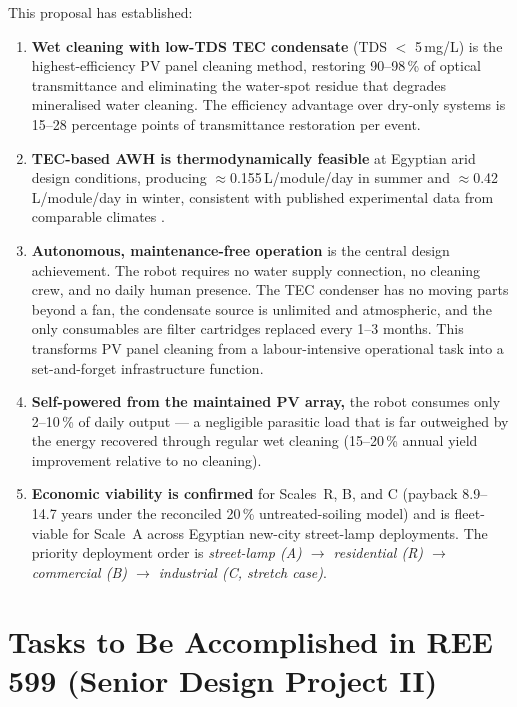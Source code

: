 \documentclass[12pt,a4paper]{report}
\numberwithin{equation}{chapter}
\numberwithin{figure}{chapter}
\numberwithin{table}{chapter}
\begin{document}
This proposal has established:

\begin{enumerate}[leftmargin=*, label=(\roman*)]
  \item \textbf{Wet cleaning with low-TDS TEC condensate} (TDS $<$ 5\,mg/L) is the
        highest-efficiency PV panel cleaning method, restoring 90--98\,\% of optical
        transmittance and eliminating the water-spot residue that degrades mineralised
        water cleaning. The efficiency advantage over dry-only systems is 15--28
        percentage points of transmittance restoration per event.
  \item \textbf{TEC-based AWH is thermodynamically feasible} at Egyptian arid design
        conditions, producing $\approx$0.155\,L/module/day in summer and
        $\approx$0.42\,L/module/day in winter, consistent with published experimental
        data from comparable climates \cite{alqaed2023awg,eslami2021tec,shourideh2021tec}.
  \item \textbf{Autonomous, maintenance-free operation} is the central design
        achievement. The robot requires no water supply connection, no cleaning crew,
        and no daily human presence. The TEC condenser has no moving parts beyond a
        fan, the condensate source is unlimited and atmospheric, and the only consumables
        are filter cartridges replaced every 1--3 months. This transforms PV panel
        cleaning from a labour-intensive operational task into a set-and-forget
        infrastructure function.
  \item \textbf{Self-powered from the maintained PV array,} the robot consumes only
        2--10\,\% of daily output --- a negligible parasitic load that is far outweighed
        by the energy recovered through regular wet cleaning (15--20\,\% annual yield
        improvement relative to no cleaning).
  \item \textbf{Economic viability is confirmed} for Scales~R, B, and C (payback
        8.9--14.7 years under the reconciled 20\,\% untreated-soiling model) and is
        fleet-viable for Scale~A across Egyptian new-city street-lamp deployments.
        The priority deployment order is \emph{street-lamp (A) $\to$ residential (R)
        $\to$ commercial (B) $\to$ industrial (C, stretch case)}.
\end{enumerate}

\section{Tasks to Be Accomplished in REE 599 (Senior Design Project II)}
\end{document}
